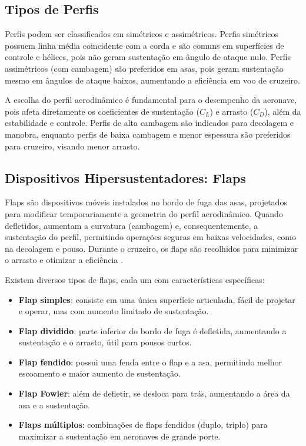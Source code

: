 \subsection{Tipos de Perfis}
Perfis podem ser classificados em simétricos e assimétricos. Perfis simétricos possuem linha média coincidente com a corda e são comuns em superfícies de controle e hélices, pois não geram sustentação em ângulo de ataque nulo. Perfis assimétricos (com cambagem) são preferidos em asas, pois geram sustentação mesmo em ângulos de ataque baixos, aumentando a eficiência em voo de cruzeiro.

A escolha do perfil aerodinâmico é fundamental para o desempenho da aeronave, pois afeta diretamente os coeficientes de sustentação (\(C_L\)) e arrasto (\(C_D\)), além da estabilidade e controle. Perfis de alta cambagem são indicados para decolagem e manobra, enquanto perfis de baixa cambagem e menor espessura são preferidos para cruzeiro, visando menor arrasto.

\subsection{Dispositivos Hipersustentadores: Flaps}
Flaps são dispositivos móveis instalados no bordo de fuga das asas, projetados para modificar temporariamente a geometria do perfil aerodinâmico. Quando defletidos, aumentam a curvatura (cambagem) e, consequentemente, a sustentação do perfil, permitindo operações seguras em baixas velocidades, como na decolagem e pouso. Durante o cruzeiro, os flaps são recolhidos para minimizar o arrasto e otimizar a eficiência \cite{raymer2018aircraft}.

Existem diversos tipos de flaps, cada um com características específicas:

\begin{itemize}
    \item \textbf{Flap simples}: consiste em uma única superfície articulada, fácil de projetar e operar, mas com aumento limitado de sustentação.
    \item \textbf{Flap dividido}: parte inferior do bordo de fuga é defletida, aumentando a sustentação e o arrasto, útil para pousos curtos.
    \item \textbf{Flap fendido}: possui uma fenda entre o flap e a asa, permitindo melhor escoamento e maior aumento de sustentação.
    \item \textbf{Flap Fowler}: além de defletir, se desloca para trás, aumentando a área da asa e a sustentação.
    \item \textbf{Flaps múltiplos}: combinações de flaps fendidos (duplo, triplo) para maximizar a sustentação em aeronaves de grande porte.
\end{itemize}

